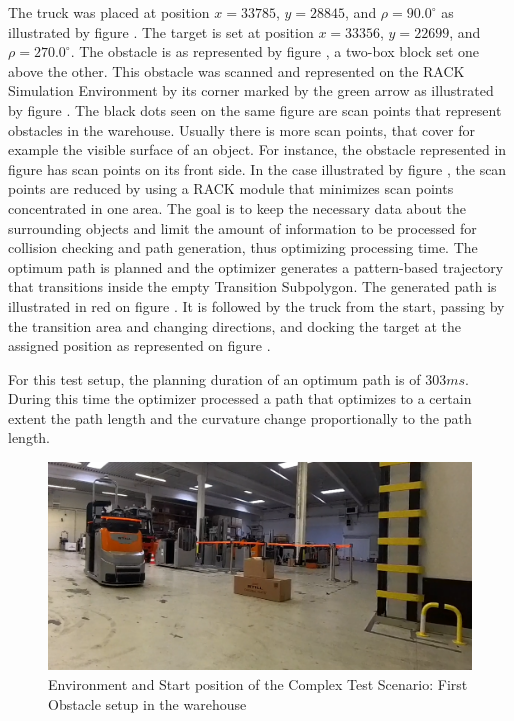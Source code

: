 The truck was placed at position \(x = 33785\), \(y = 28845\), and \(\rho = 90.0^\circ\) as illustrated by figure 
. The target is set at position \(x = 33356\), \(y = 22699\), and \(\rho = 270.0^\circ\).
The obstacle is as represented by figure , a two-box block set one above the other. 
This obstacle was scanned and represented on the RACK Simulation 
Environment by its corner marked by the green arrow as illustrated by figure .
The black dots seen on the same figure are scan points that represent obstacles in the warehouse. 
Usually there is more scan points, that cover for example the visible surface of an object.
For instance, the obstacle represented in figure  has scan points on its front side.
In the case illustrated by figure , the scan points are reduced by using a RACK module 
that minimizes scan points concentrated in one area. The goal is to keep the necessary data about the surrounding 
objects and limit the amount of information to be processed 
for collision checking and path generation, thus optimizing processing time.
The optimum path is planned and the optimizer generates a pattern-based trajectory that transitions
inside the empty Transition Subpolygon. 
The generated path is illustrated in red on figure . It is followed 
by the truck from the start, passing by the transition area and changing directions, and docking the 
target at the assigned position as represented on figure . 

For this test setup, the planning duration of an optimum path is of \(303ms\). During this time
the optimizer processed a path that optimizes to a certain extent the path length and 
the curvature change proportionally to the path length.


\begin{figure}[H]
    \begin{center}
        \includegraphics[width=5in]{images/Chap3/Test2_ObsLeftVehic/Start_real.png} %
        \caption{Environment and Start position of the Complex Test Scenario: First Obstacle setup in the warehouse}
        \label{OptResult12}
        \end{center}    
\end{figure}

